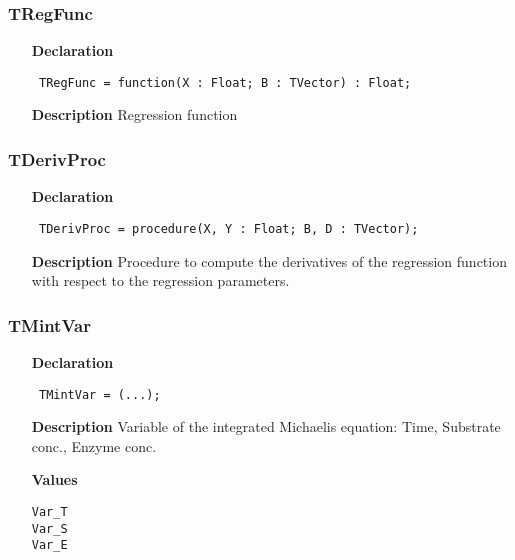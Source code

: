 \documentclass[12pt,a4paper,oneside]{report}
\newcommand{\declarationitem}[1]{\textbf{#1}}
\newcommand{\descriptiontitle}[1]{\textbf{#1}}
\newcommand{\code}[1]{\texttt{#1}}
\begin{document}
\subsubsection{TRegFunc}
\label{utypes-TRegFunc}
\begin{itemize}\item[\declarationitem{Declaration}\hfill]
	\begin{flushleft}
		\code{
			TRegFunc = function(X : Float; B : TVector) : Float;}
	\end{flushleft}
	\item[\descriptiontitle{Description}]
	Regression function
\end{itemize}
\subsubsection{TDerivProc}
\label{utypes-TDerivProc}
\begin{itemize}\item[\declarationitem{Declaration}\hfill]
	\begin{flushleft}
		\code{
			TDerivProc = procedure(X, Y : Float; B, D : TVector);}
		
	\end{flushleft}
	
	\par
	\item[\descriptiontitle{Description}]
	Procedure to compute the derivatives of the regression function with respect to the regression parameters.
	
\end{itemize}
\subsubsection{TMintVar}
\label{utypes-TMintVar}
\begin{itemize}\item[\declarationitem{Declaration}\hfill]
	\begin{flushleft}
		\code{
			TMintVar = (...);}
		
	\end{flushleft}
	
	\par
	\item[\descriptiontitle{Description}]
	Variable of the integrated Michaelis equation: Time, Substrate conc., Enzyme conc.\item[\textbf{Values}]
	\begin{description}
		\item[\texttt{Var{\_}T}]  
		\item[\texttt{Var{\_}S}]  
		\item[\texttt{Var{\_}E}]  
	\end{description}
\end{itemize}
\end{document}
